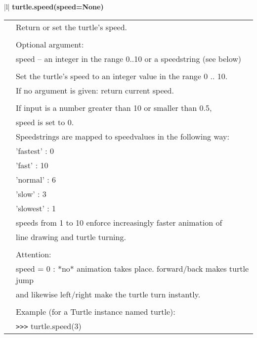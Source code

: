 \begin{center}
{\begin{tabular}{|l|}
{\bf    turtle.speed(speed=None)} \\
   \begin{tabular}{p{0.25in}p{4in}}
&        Return or set the turtle's speed. \\
&  \\
&        Optional argument: \\
&        speed -- an integer in the range 0..10 or a speedstring (see below) \\
&  \\
&        Set the turtle's speed to an integer value in the range 0 .. 10. \\
&        If no argument is given: return current speed. \\
&  \\
&        If input is a number greater than 10 or smaller than 0.5, \\
&        speed is set to 0. \\
&        Speedstrings  are mapped to speedvalues in the following way: \\
&            'fastest' :  0 \\
&            'fast'    :  10 \\
&            'normal'  :  6 \\
&            'slow'    :  3 \\
&            'slowest' :  1 \\
&        speeds from 1 to 10 enforce increasingly faster animation of \\
&        line drawing and turtle turning. \\
&  \\
&        Attention: \\
&        speed = 0 : *no* animation takes place. forward/back makes turtle jump \\
&        and likewise left/right make the turtle turn instantly. \\
&  \\
&        Example (for a Turtle instance named turtle): \\
&        \verb+>+\verb+>+\verb+>+ turtle.speed(3) \\
\end{tabular} \\ \hline


\end{tabular}}
\end{center}
